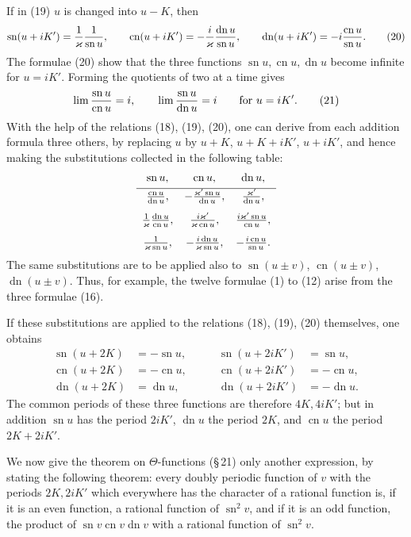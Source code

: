 \documentclass[11pt]{article}
\providecommand{\sn}{\operatorname{sn}}
\providecommand{\cn}{\operatorname{cn}}
\providecommand{\dn}{\operatorname{dn}}
\begin{document}
If in (19) $u$ is changed into $u-K$, then
\begin{equation}
\sn(u+iK')={1\over\varkappa}{1\over\sn u},
\qquad
\cn(u+iK')=-{i\over\varkappa}{\dn u\over\sn u},
\qquad
\dn(u+iK')=-i{\cn u\over\sn u}.
\tag{20}
\end{equation}
The formulae (20) show that the three functions $\sn u,\cn u,\dn u$ become infinite for $u=iK'$. Forming the quotients of two at a time gives
\begin{equation}
\lim{\sn u\over\cn u}=i,
\qquad
\lim{\sn u\over\dn u}=i
\qquad\text{for }u=iK'.
\tag{21}
\end{equation}
With the help of the relations (18), (19), (20), one can derive from each addition formula three others, by replacing $u$ by $u+K$, $u+K+iK'$, $u+iK'$, and hence making the substitutions collected in the following table:
\[
\begin{array}{ccc}
\sn u,&\cn u,&\dn u,\\[0.3em]\hline
{\cn u\over\dn u},&-{\varkappa'\sn u\over\dn u},&{\varkappa'\over\dn u},\\[0.8em]
{1\over\varkappa}{\dn u\over\cn u},&{i\varkappa'\over\varkappa\cn u},&{i\varkappa'\sn u\over\cn u},\\[0.8em]
{1\over\varkappa\sn u},&-{i\dn u\over\varkappa\sn u},&-{i\cn u\over\sn u}.
\end{array}
\]
The same substitutions are to be applied also to $\sn(u\pm v)$, $\cn(u\pm v)$, $\dn(u\pm v)$. Thus, for example, the twelve formulae (1) to (12) arise from the three formulae (16).

If these substitutions are applied to the relations (18), (19), (20) themselves, one obtains
\begin{equation}
\begin{aligned}
\sn(u+2K)&=-\sn u,&\qquad \sn(u+2iK')&=\sn u,\\
\cn(u+2K)&=-\cn u,&\qquad \cn(u+2iK')&=-\cn u,\\
\dn(u+2K)&=\dn u,&\qquad \dn(u+2iK')&=-\dn u.
\end{aligned}
\tag{22}
\end{equation}
The common periods of these three functions are therefore $4K,4iK'$; but in addition $\sn u$ has the period $2iK'$, $\dn u$ the period $2K$, and $\cn u$ the period $2K+2iK'$.

We now give the theorem on $\Theta$-functions (\S\,21) only another expression, by stating the following theorem: every doubly periodic function of $v$ with the periods $2K,2iK'$ which everywhere has the character of a rational function is, if it is an even function, a rational function of $\sn^2v$, and if it is an odd function, the product of $\sn v\cn v\dn v$ with a rational function of $\sn^2v$.
\end{document}

